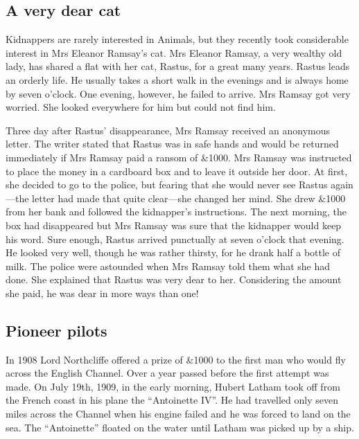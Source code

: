 \documentclass[11pt]{article}
\begin{document}
\subsection{A very dear cat}
\label{sec-1-19}

Kidnappers are rarely interested in Animals, but they recently took considerable interest in Mrs Eleanor Ramsay's cat. Mrs Eleanor Ramsay, a very wealthy old lady, has shared a flat with her cat, Rastus, for a great many years. Rastus leads an orderly life. He usually takes a short walk in the evenings and is always home by seven o'clock. One evening, however, he failed to arrive. Mrs Ramsay got very worried. She looked everywhere for him but could not find him.

Three day after Rastus' disappearance, Mrs Ramsay received an anonymous letter. The writer stated that Rastus was in safe hands and would be returned immediately if Mrs Ramsay paid a ransom of \&1000. Mrs Ramsay was instructed to place the money in a cardboard box and to leave it outside her door. At first, she decided to go to the police, but fearing that she would never see Rastus again---the letter had made that quite clear---she changed her mind. She drew \&1000 from her bank and followed the kidnapper's instructions. The next morning, the box had disappeared but Mrs Ramsay was sure that the kidnapper would keep his word. Sure enough, Rastus arrived punctually at seven o'clock that evening. He looked very well, though he was rather thirsty, for he drank half a bottle of milk. The police were astounded when Mrs Ramsay told them what she had done. She explained that Rastus was very dear to her. Considering the amount she paid, he was dear in more ways than one! 
\subsection{Pioneer pilots}
\label{sec-1-20}

In 1908 Lord Northcliffe offered a prize of \&1000 to the first man who would fly across the English Channel. Over a year passed before the first attempt was made. On July 19th, 1909, in the early morning, Hubert Latham took off from the French coast in his plane the ``Antoinette IV''. He had travelled only seven miles across the Channel when his engine failed and he was forced to land on the sea. The ``Antoinette'' floated on the water until Latham was picked up by a ship. 
\end{document}
